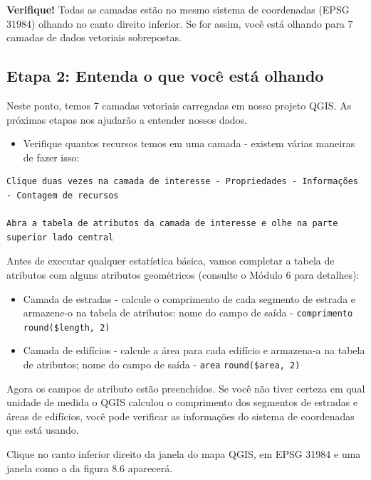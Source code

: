 \documentclass[
]{krantz}
\providecommand{\tightlist}{%
  \setlength{\itemsep}{0pt}\setlength{\parskip}{0pt}}
\begin{document}
\textbf{Verifique!} Todas as camadas estão no mesmo sistema de coordenadas (EPSG 31984) olhando no canto direito inferior. Se for assim, você está olhando para 7 camadas de dados vetoriais sobrepostas.

\hypertarget{etapa-2-entenda-o-que-vocuxea-estuxe1-olhando}{%
\subsection{Etapa 2: Entenda o que você está olhando}\label{etapa-2-entenda-o-que-vocuxea-estuxe1-olhando}}

Neste ponto, temos 7 camadas vetoriais carregadas em nosso projeto QGIS. As próximas etapas nos ajudarão a entender nossos dados.

\begin{itemize}
\tightlist
\item
  Verifique quantos recursos temos em uma camada - existem várias maneiras de fazer isso:
\end{itemize}

\begin{verbatim}
Clique duas vezes na camada de interesse - Propriedades - Informações - Contagem de recursos

Abra a tabela de atributos da camada de interesse e olhe na parte superior lado central
\end{verbatim}

Antes de executar qualquer estatística básica, vamos completar a tabela de atributos com alguns atributos geométricos (consulte o Módulo 6 para detalhes):

\begin{itemize}
\tightlist
\item
  Camada de estradas - calcule o comprimento de cada segmento de estrada e armazene-o na tabela de atributos: nome do campo de saída - \texttt{comprimento} \texttt{round(\$length,\ 2)}
\item
  Camada de edifícios - calcule a área para cada edifício e armazena-a na tabela de atributos; nome do campo de saída - \texttt{area} \texttt{round(\$area,\ 2)}
\end{itemize}

Agora os campos de atributo estão preenchidos. Se você não tiver certeza em qual unidade de medida o QGIS calculou o comprimento dos segmentos de estradas e áreas de edifícios, você pode verificar as informações do sistema de coordenadas que está usando.

Clique no canto inferior direito da janela do mapa QGIS, em EPSG 31984 e uma janela como a da figura 8.6 aparecerá.
\end{document}
